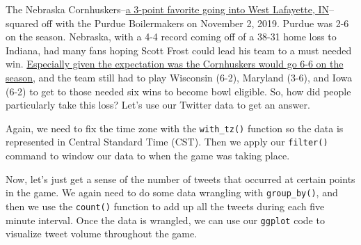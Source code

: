 \documentclass[]{book}
\newenvironment{Shaded}{\begin{snugshade}}{\end{snugshade}}
\newcommand{\DataTypeTok}[1]{\textcolor[rgb]{0.13,0.29,0.53}{#1}}
\newcommand{\KeywordTok}[1]{\textcolor[rgb]{0.13,0.29,0.53}{\textbf{#1}}}
\newcommand{\NormalTok}[1]{#1}
\newcommand{\OperatorTok}[1]{\textcolor[rgb]{0.81,0.36,0.00}{\textbf{#1}}}
\newcommand{\StringTok}[1]{\textcolor[rgb]{0.31,0.60,0.02}{#1}}
\begin{document}
The Nebraska Cornhuskers--\href{https://nebraska.rivals.com/news/nebraska-at-purdue-keys-to-victory-hol-score-predictions}{a 3-point favorite going into West Lafayette, IN}--squared off with the Purdue Boilermakers on November 2, 2019. Purdue was 2-6 on the season. Nebraska, with a 4-4 record coming off of a 38-31 home loss to Indiana, had many fans hoping Scott Frost could lead his team to a must needed win. \href{https://journalstar.com/sports/huskers/sipple/steven-m-sipple-frost-s-reaction-to-moos-six-win/article_bcebc067-865e-59a7-948d-c99290201294.html}{Especially given the expectation was the Cornhuskers would go 6-6 on the season}, and the team still had to play Wisconsin (6-2), Maryland (3-6), and Iowa (6-2) to get to those needed six wins to become bowl eligible. So, how did people particularly take this loss? Let's use our Twitter data to get an answer.

Again, we need to fix the time zone with the \texttt{with\_tz()} function so the data is represented in Central Standard Time (CST). Then we apply our \texttt{filter()} command to window our data to when the game was taking place.

\begin{Shaded}
\end{Shaded}

Now, let's just get a sense of the number of tweets that occurred at certain points in the game. We again need to do some data wrangling with \texttt{group\_by()}, and then we use the \texttt{count()} function to add up all the tweets during each five minute interval. Once the data is wrangled, we can use our \texttt{ggplot} code to visualize tweet volume throughout the game.
\end{document}
